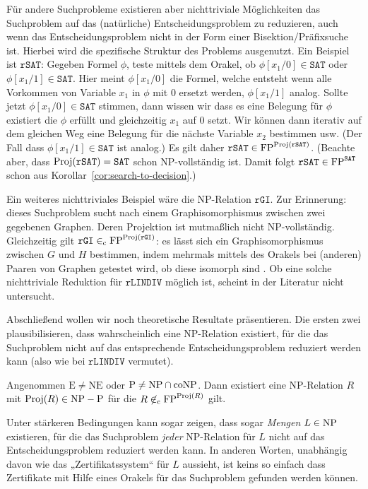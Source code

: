 Für andere Suchprobleme existieren aber nichttriviale Möglichkeiten  das Suchproblem auf das (natürliche) Entscheidungsproblem zu reduzieren, auch wenn das Entscheidungsproblem nicht in der Form einer Bisektion/Präfixsuche ist. Hierbei wird die spezifische Struktur des Problems ausgenutzt. Ein Beispiel ist $\mathtt{rSAT}$: Gegeben Formel $\phi$, teste mittels dem Orakel, ob $\phi[x_1/0]\in\mathtt{SAT}$ oder $\phi[x_1/1]\in\mathtt{SAT}$. Hier meint $\phi[x_1/0]$ die Formel, welche entsteht wenn alle Vorkommen von Variable $x_1$ in $\phi$ mit $0$ ersetzt werden, $\phi[x_1/1]$ analog. Sollte jetzt $\phi[x_1/0]\in\mathtt{SAT}$ stimmen, dann wissen wir dass es eine Belegung für $\phi$ existiert die $\phi$ erfüllt und gleichzeitig $x_1$ auf $0$ setzt. Wir können dann iterativ auf dem gleichen Weg eine Belegung für die nächste Variable $x_2$ bestimmen usw. (Der Fall dass $\phi[x_1/1]\in\mathtt{SAT}$ ist analog.) Es gilt daher $\mathtt{rSAT}\in\mathrm{FP}^{\operatorname{Proj}(\mathtt{rSAT})}$.
(Beachte aber, dass $\operatorname{Proj}(\mathtt{rSAT})=\mathtt{SAT}$ schon NP-vollständig ist. Damit folgt $\mathtt{rSAT}\in \mathrm{FP}^{\mathtt{SAT}}$ schon aus Korollar~\ref{cor:search-to-decision}.)

Ein weiteres nichttriviales Beispiel wäre die NP-Relation $\mathtt{rGI}$. Zur Erinnerung: dieses Suchproblem sucht nach einem Graphisomorphismus zwischen zwei gegebenen Graphen.
Deren Projektion ist mutmaßlich nicht NP-vollständig. 
Gleichzeitig gilt $\mathtt{rGI}\in_\mathrm{c} \mathrm{FP}^{\operatorname{Proj}(\mathtt{rGI})}$: es lässt sich ein Graphisomorphismus zwischen $G$ und $H$ bestimmen, indem mehrmals mittels des Orakels bei (anderen) Paaren von  Graphen getestet wird, ob diese isomorph sind \parencite[vgl.][S. 65, 100]{goldreich_computational_2008}.
Ob eine solche nichttriviale Reduktion für $\mathtt{rLINDIV}$ möglich ist, scheint in der Literatur nicht untersucht.

Abschließend wollen wir noch theoretische Resultate präsentieren. Die ersten zwei plausibilisieren, dass wahrscheinlich eine NP-Relation existiert, für die das Suchproblem nicht auf das entsprechende Entscheidungsproblem reduziert werden kann (also wie bei $\mathtt{rLINDIV}$ vermutet).

\begin{theorem}
    Angenommen $\mathrm{E\neq NE}$ oder $\mathrm{P}\neq \mathrm{NP}\cap\mathrm{coNP}$. Dann existiert eine NP-Relation $R$ mit $\operatorname{Proj}(R)\in \mathrm{NP}-\mathrm{P}$ für die $R\not\in_\mathrm{c}\mathrm{FP}^{\operatorname{Proj}(R)}$ gilt.
\end{theorem}

Unter stärkeren Bedingungen kann sogar zeigen, dass sogar \emph{Mengen} $L\in\mathrm{NP}$ existieren, für die das Suchproblem \emph{jeder} NP-Relation für $L$ nicht auf das Entscheidungsproblem reduziert werden kann. In anderen Worten, unabhängig davon wie das „Zertifikatssystem“ für $L$ aussieht, ist keins so einfach dass Zertifikate mit Hilfe eines Orakels für das Suchproblem gefunden werden können.


